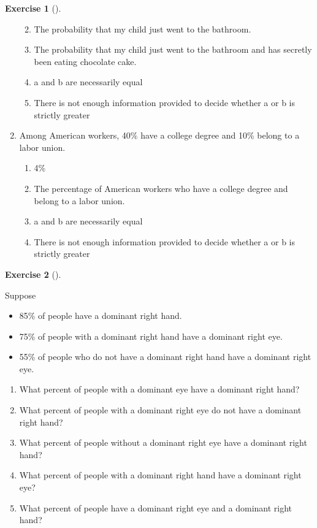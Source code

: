 \documentclass[
  letterpaper,
  DIV=11,
  numbers=noendperiod]{scrreprt}
\providecommand{\tightlist}{%
  \setlength{\itemsep}{0pt}\setlength{\parskip}{0pt}}
\theoremstyle{plain}
\theoremstyle{definition}
\theoremstyle{definition}
\newtheorem{exercise}{Exercise}[chapter]
\theoremstyle{definition}
\theoremstyle{remark}
\begin{document}
\begin{exercise}[]
\begin{enumerate}
  \begin{enumerate}
  \def\labelenumii{\alph{enumii}.}
  \tightlist
  \item
    The probability that my child just went to the bathroom.
  \item
    The probability that my child just went to the bathroom and has
    secretly been eating chocolate cake.
  \item
    a and b are necessarily equal
  \item
    There is not enough information provided to decide whether a or b is
    strictly greater
  \end{enumerate}
\item
  Among American workers, 40\% have a college degree and 10\% belong to
  a labor union.

  \begin{enumerate}
  \def\labelenumii{\alph{enumii}.}
  \tightlist
  \item
    4\%
  \item
    The percentage of American workers who have a college degree and
    belong to a labor union.
  \item
    a and b are necessarily equal
  \item
    There is not enough information provided to decide whether a or b is
    strictly greater
  \end{enumerate}
\end{enumerate}

\end{exercise}

\begin{exercise}[]\protect\hypertarget{exr-right-dominance}{}\label{exr-right-dominance}

Suppose

\begin{itemize}
\tightlist
\item
  85\% of people have a dominant right hand.
\item
  75\% of people with a dominant right hand have a dominant right eye.
\item
  55\% of people who do not have a dominant right hand have a dominant
  right eye.
\end{itemize}

\begin{enumerate}
\def\labelenumi{\arabic{enumi}.}
\tightlist
\item
  What percent of people with a dominant eye have a dominant right hand?
\item
  What percent of people with a dominant right eye do not have a
  dominant right hand?
\item
  What percent of people without a dominant right eye have a dominant
  right hand?
\item
  What percent of people with a dominant right hand have a dominant
  right eye?
\item
  What percent of people have a dominant right eye and a dominant right
  hand?
\end{enumerate}

\end{exercise}
\end{document}
